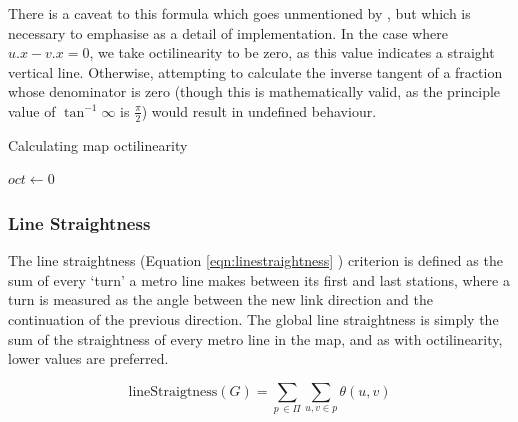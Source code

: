There is a caveat to this formula which goes unmentioned by \citeauthor{AutomaticMetroMapLayoutThesis}, but which is necessary to emphasise as a detail of implementation. In the case where $u.x - v.x = 0$, we take octilinearity to be zero, as this value indicates a straight vertical line. Otherwise, attempting to calculate the inverse tangent of a fraction whose denominator is zero (though this is mathematically valid, as the principle value of $\tan^{-1}\infty$ is $\frac{\pi}{2}$) would result in undefined behaviour.\\

\begin{algorithm}
\label{alg:octilinearity}
 \caption{Calculating map octilinearity}
 $oct \gets 0$ \;
\end{algorithm}

\subsubsection{Line Straightness}

The line straightness (Equation \ref{eqn:linestraightness} \citep{AutomaticMetroMapLayoutThesis}) criterion is defined as the sum of every `turn' a metro line makes between its first and last stations, where a turn is measured as the angle between the new link direction and the continuation of the previous direction. The global line straightness is simply the sum of the straightness of every metro line in the map, and as with octilinearity, lower values are preferred.

\begin{equation}
	\text{lineStraigtness}(G) = \sum_{p\,\in{\Pi}}\sum_{u, v\in p} \theta(u, v)
\label{eqn:linestraightness}
\end{equation}

